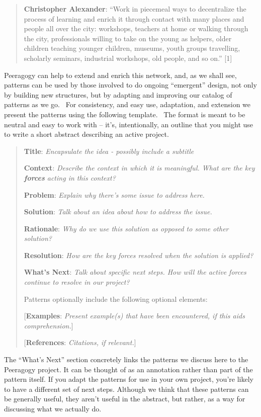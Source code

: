 \begin{quote}
\textbf{Christopher Alexander}: ``Work in piecemeal ways to decentralize
the process of learning and enrich it through contact with many places
and people all over the city: workshops, teachers at home or walking
through the city, professionals willing to take on the young as helpers,
older children teaching younger children, museums, youth groups
travelling, scholarly seminars, industrial workshops, old people, and so
on.'' {{[}1{]}}
\end{quote}

Peeragogy can help to extend and enrich this network, and, as we shall
see, patterns can be used by those involved to do ongoing ``emergent''
design, not only by building new structures, but by adapting and
improving our catalog of patterns as we go.~ For consistency, and easy
use, adaptation, and extension we present the patterns using the
following template.~ The format is meant to be neutral and easy to work
with -- it's, intentionally, an outline that you might use to write a
short abstract describing an active project.

\begin{quote}
\textbf{Title}: \emph{Encapsulate the idea - possibly include a
subtitle}

\textbf{Context}: \emph{Describe the context in which it is meaningful.
What are the key \textbf{forces} acting in this context?}

\textbf{Problem}: \emph{Explain why there's some issue to address here.}

\textbf{Solution}: \emph{Talk about an idea about how to address the
issue.}

\textbf{Rationale}: \emph{Why do we use this solution as opposed to some
other solution?}

\textbf{Resolution}: \emph{How are the key forces resolved when the
solution is applied?}

\textbf{What's Next}: \emph{Talk about specific next steps. How will the
active forces continue to resolve in our project?}

Patterns optionally include the following optional elements:

{{[}\textbf{Examples}: \emph{Present example(s) that have been
encountered, if this aids comprehension.}{]}}

{{[}\textbf{References}: \emph{Citations, if relevant.}{]}}
\end{quote}

The ``What's Next'' section concretely links the patterns we discuss
here to the Peeragogy project. It can be thought of as an annotation
rather than part of the pattern itself. If you adapt the patterns for
use in your own project, you're likely to have a different set of next
steps. Although we think that these patterns can be generally useful,
they aren't useful in the abstract, but rather, as a way for discussing
what we actually do.

